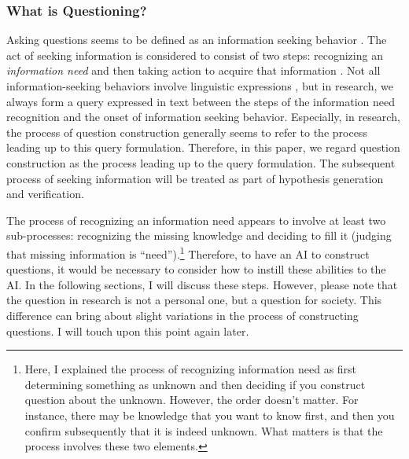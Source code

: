 \subsubsection{What is Questioning?}
Asking questions seems to be defined as an information seeking behavior \cite{watson_2021,taylor1962process}. The act of seeking information is considered to consist of two steps: recognizing an \textit{information need} and then taking action to acquire that information \cite{wilson1997information,case2016looking}. Not all information-seeking behaviors involve linguistic expressions \cite{watson_2021}, but in research, we always form a query expressed in text between the steps of the information need recognition and the onset of information seeking behavior. Especially, in research, the process of question construction generally seems to refer to the process leading up to this query formulation. Therefore, in this paper, we regard question construction as the process leading up to the query formulation. The subsequent process of seeking information will be treated as part of hypothesis generation and verification.

The process of recognizing an information need appears to involve at least two sub-processes: recognizing the missing knowledge and deciding to fill it (judging that missing information is ``need'').\footnote{
Here, I explained the process of recognizing information need as first determining something as unknown and then deciding if you construct question about the unknown. However, the order doesn't matter. For instance, there may be knowledge that you want to know first, and then you confirm subsequently that it is indeed unknown. What matters is that the process involves these two elements.
} Therefore, to have an AI to construct questions, it would be necessary to consider how to instill these abilities to the AI. In the following sections, I will discuss these steps. However, please note that the question in research is not a personal one, but a question for society. This difference can bring about slight variations in the process of constructing questions. I will touch upon this point again later.




